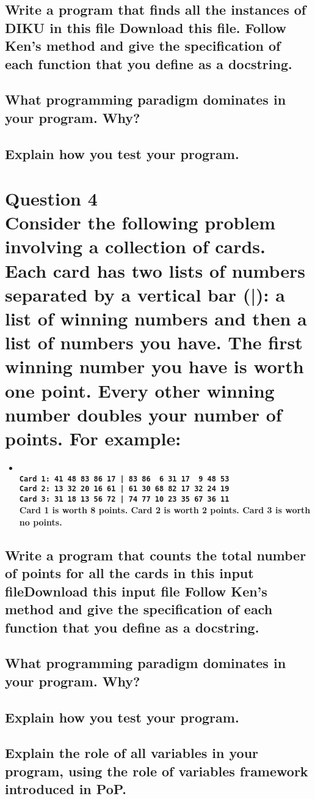 \documentclass[a4paper,12pt]{article}
\begin{document}
\subsection{Write a program that finds all the instances of DIKU in this file Download this file.
Follow Ken's method and give the specification of each function that you define as a docstring.}

\subsection{What programming paradigm dominates in your program. Why?}

\subsection{Explain how you test your program.}

\section{Question 4\\
Consider the following problem involving a collection of cards.
Each card has two lists of numbers separated by a vertical bar (|): a list of winning numbers and then a list of numbers you have.
The first winning number you have is worth one point. Every other winning number doubles your number of points.
For example:}
\begin{itemize}
    \item[] \textbf{\\
    \lstinline{Card 1: 41 48 83 86 17 | 83 86  6 31 17  9 48 53}\\
    \lstinline{Card 2: 13 32 20 16 61 | 61 30 68 82 17 32 24 19}\\
    \lstinline{Card 3: 31 18 13 56 72 | 74 77 10 23 35 67 36 11}\\
    Card 1 is worth 8 points. Card 2 is worth 2 points. Card 3 is worth no points.}
\end{itemize}

\subsection{Write a program that counts the total number of points for all the cards in this input fileDownload this input file
Follow Ken's method and give the specification of each function that you define as a docstring.}

\subsection{What programming paradigm dominates in your program. Why?}

\subsection{Explain how you test your program.}

\subsection{Explain the role of all variables in your program, using the role of variables framework introduced in PoP.}
\end{document}
